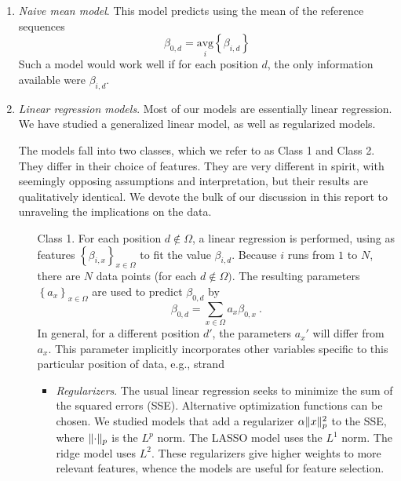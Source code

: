 \documentclass{article} %
\DeclarePairedDelimiter{\norm}{\lVert}{\rVert}
\begin{document}
\begin{enumerate}

\item \emph{Naive mean model}. This model predicts using the mean of the reference sequences
\[ \beta_{0,d} = \underset{i}{\text{avg}} \left\{ \beta_{i,d}\right\}\]
Such a model would work well if for each position $d$, the only information available were $\beta_{i,d}$.
\item \emph{Linear regression models}. Most of our models are essentially linear regression. We have studied a generalized linear model, as well as regularized models.

The models fall into two classes, which we refer to as Class 1 and Class 2. They differ in their choice of features. They are very different in spirit, with seemingly opposing assumptions and interpretation, but their results are qualitatively identical. We devote the bulk of our discussion in this report to unraveling the implications on the data.

\begin{itemize}
\item [Class 1.] For each position $d \notin \Omega$, a linear regression is performed, using as features $\left\{ \beta_{i,x} \right\}_{x \in \Omega}$ to fit the value $\beta_{i,d}$. Because $i$ runs from $1$ to $N$, there are $N$ data points (for each $d \notin \Omega)$. The resulting parameters $\left\{ a_x\right\}_{x \in \Omega}$ are used to predict $\beta_{0,d}$ by
\begin{equation} \label{beta.sites}\beta_{0,d} = \sum_{x \in \Omega} a_x \beta_{0,x} \ .\end{equation}
In general, for a different position $d'$, the parameters $a_x'$ will differ from $a_x$. This parameter implicitly incorporates other variables specific to this particular position of data, e.g., strand

\begin{itemize}
\item \emph{Regularizers}. The usual linear regression seeks to minimize the sum of the squared errors (SSE). Alternative optimization functions can be chosen. We studied models that add a regularizer $\alpha \norm{x}_p^2$ to the SSE, where $\norm{\cdot}_p$ is the $L^p$ norm. The LASSO model uses the $L^1$ norm. The ridge model uses $L^2$. These regularizers give higher weights to more relevant features, whence the models are useful for feature selection.
\end{itemize}




\end{itemize}
\end{enumerate}
\end{document}
